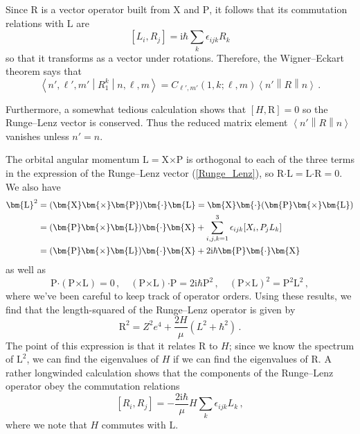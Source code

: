 \documentclass{article}
\theoremstyle{plain}\theoremheaderfont{\normalfont\itshape}\theorembodyfont{\rmfamily}\theoremseparator{.}\newtheorem*{rem}{Remark}\newtheorem*{ex}{Example}\newtheorem*{proof}{Proof}\newtheorem*{altp}{Alternative proof}
\theoremstyle{plain}\theoremheaderfont{\normalfont\bfseries}\theorembodyfont{\rmfamily}\theoremseparator{.}\newtheorem{thm}{Theorem}[section]\newtheorem{lem}[thm]{Lemma}\newtheorem{prop}[thm]{Proposition}\newtheorem*{cor}{Corollary}\newtheorem{defn}[thm]{Definition}\newtheorem{clm}[thm]{Claim}\newtheorem{clminproof}{Claim}
\theoremstyle{break}\theoremheaderfont{\normalfont\itshape}\theorembodyfont{\rmfamily}\theoremseparator{.\medskip}\newtheorem*{proofskip}{Proof}\newtheorem*{exs}{Examples}\newtheorem*{rems}{Remarks}
\theoremstyle{break}\theoremheaderfont{\normalfont\bfseries}\theorembodyfont{\rmfamily}\theoremseparator{.\medskip}\newtheorem{lemskip}[thm]{Lemma}\newtheorem{defnskip}[thm]{Definition}\newtheorem{propskip}[thm]{Proposition}\newtheorem{thmskip}[thm]{Theorem}
\numberwithin{equation}{section}
\newcommand{\ii}{\mathrm{i}}
\newcommand{\mel}[3]{\left\langle #1 \middle| #2 \middle| #3 \right\rangle}
\newcommand{\redmel}[3]{\left\langle #1 \middle\| #2 \middle\| #3 \right\rangle}
\newcommand{\vb}[1]{\bm{\mathrm{#1}}}
\newcommand{\cross}{\bm{\times}}
\newcommand{\vdot}{\bm{\cdot}}
\begin{document}
    Since \(\vb{R}\) is a vector operator built from \(\vb{X}\) and \(\vb{P}\), it follows that its commutation relations with \(\vb{L}\) are
    \begin{equation}\label{ang_mom_RL_vec_commutation}
        [L_i,R_j]=\ii\hbar\sum_k \epsilon_{ijk}R_k
    \end{equation}
    so that it transforms as a vector under rotations. Therefore, the Wigner--Eckart theorem says that
    \begin{equation}
        \mel{n',\ell',m'}{R_1^k}{n,\ell,m}=C_{\ell',m'}(1,k;\ell,m)\redmel{n'}{R}{n}\,.
    \end{equation}

    Furthermore, a somewhat tedious calculation shows that \([H,\vb{R}]=0\) so the Runge--Lenz vector is conserved. Thus the reduced matrix element \(\redmel{n'}{R}{n}\) vanishes unless \(n'=n\).

    The orbital angular momentum \(\vb{L}=\vb{X}\cross\vb{P}\) is orthogonal to each of the three terms in the expression of the Runge--Lenz vector (\ref{Runge_Lenz}), so \(\vb{R}\vdot\vb{L}=\vb{L}\vdot\vb{R}=0\). We also have
    \begin{align}
        \vb{L}^2&=(\vb{X}\cross\vb{P})\vdot\vb{L}=\vb{X}\vdot(\vb{P}\cross\vb{L})\notag\\
        &=(\vb{P}\cross\vb{L})\vdot\vb{X}+\sum_{i,j,k=1}^{3}\epsilon_{ijk}[X_i,P_jL_k]\notag\\
        &=(\vb{P}\cross\vb{L})\vdot\vb{X}+2\ii\hbar\vb{P}\vdot\vb{X}
    \end{align}
    as well as
    \begin{equation}
        \vb{P}\vdot(\vb{P}\cross\vb{L})=0\,,\quad (\vb{P}\cross\vb{L})\vdot\vb{P}=2\ii\hbar\vb{P}^2\,,\quad(\vb{P}\cross\vb{L})^2=\vb{P}^2\vb{L}^2\,,
    \end{equation}
    where we've been careful to keep track of operator orders. Using these results, we find that the length-squared of the Runge--Lenz operator is given by
    \begin{equation}
        \vb{R}^2=Z^2e^4+\frac{2H}{\mu}(L^2+\hbar^2)\,.
    \end{equation}
    The point of this expression is that it relates \(\vb{R}\) to \(H\); since we know the spectrum of \(\vb{L}^2\), we can find the eigenvalues of \(H\) if we can find the eigenvalues of \(\vb{R}\). A rather longwinded calculation shows that the components of the Runge--Lenz operator obey the commutation relations
    \begin{equation}\label{RL_vector_commutation}
        [R_i,R_j]=-\frac{2\ii\hbar}{\mu}H\sum_k \epsilon_{ijk}L_k\,,
    \end{equation}
    where we note that \(H\) commutes with \(\vb{L}\).
\end{document}
